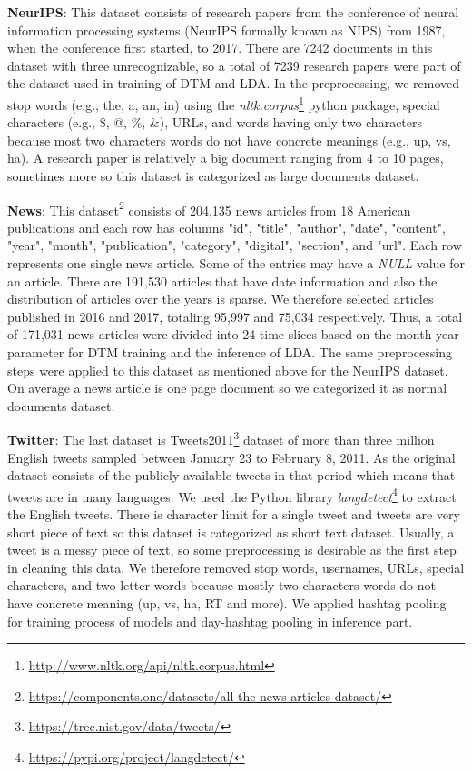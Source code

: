 \documentclass[a4paper]{report}
\begin{document}
\textbf{NeurIPS}: This dataset consists of research papers from the conference of neural information processing systems (NeurIPS formally known as NIPS) from 1987, when the conference first started, to 2017. There are 7242 documents in this dataset with three unrecognizable, so a total of 7239 research papers were part of the dataset used in training of DTM and LDA.  In the preprocessing, we removed stop words (e.g., the, a, an, in) using the \textit{nltk.corpus}\footnote{\url{http://www.nltk.org/api/nltk.corpus.html}} python package, special characters (e.g., \$, @, \%, \&), URLs, and words having only two characters because most two characters words do not have concrete meanings (e.g., up, vs, ha). A research paper is relatively a big document ranging from 4 to 10 pages, sometimes more so this dataset is categorized as large documents dataset. 

\textbf{News}: This dataset\footnote{\url{https://components.one/datasets/all-the-news-articles-dataset/}} consists of 204,135 news articles from 18 American publications and each row has columns "id", "title", "author", "date", "content", "year", "month", "publication", "category", "digital", "section", and "url". Each row represents one single news article. Some of the entries may have a \textit{NULL} value for an article. There are 191,530 articles that have date information and also the distribution of articles over the years is sparse. We therefore selected articles published in 2016 and 2017, totaling 95,997 and 75,034 respectively. Thus, a total of 171,031 news articles were divided into 24 time slices based on the month-year parameter for DTM training and the inference of LDA. The same preprocessing steps were applied to this dataset as mentioned above for the NeurIPS dataset. On average a news article is one page document so we categorized it as normal documents dataset.

\textbf{Twitter}: The last dataset is Tweets2011\footnote{\url{https://trec.nist.gov/data/tweets/}} dataset of more than three million English tweets sampled between January 23 to February 8, 2011. As the original dataset consists of the publicly available tweets in that period which means that tweets are in many languages. We used the Python library \textit{langdetect}\footnote{\url{https://pypi.org/project/langdetect/}} to extract the English tweets. There is character limit for a single tweet and tweets are very short piece of text so this dataset is categorized as short text dataset. Usually, a tweet is a messy piece of text, so some preprocessing is desirable as the first step in cleaning this data.
We therefore removed stop words, usernames, URLs, special characters, and two-letter words because mostly two characters words do not have concrete meaning (up, vs, ha, RT and more). We applied hashtag pooling for training process of models and day-hashtag pooling in inference part.
\end{document}
